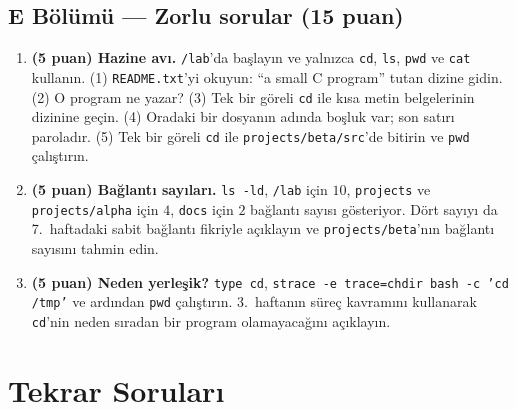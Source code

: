 \documentclass[11pt,a4paper]{article}
\newcommand{\cmd}[1]{\texttt{#1}}
\begin{document}
\subsection*{E Bölümü --- Zorlu sorular (15 puan)}
\begin{enumerate}[label=\textbf{E\arabic*}, leftmargin=2.2em, start=16]
  \item \textbf{(5 puan) Hazine avı.} \texttt{\tl/lab}'da başlayın ve yalnızca \cmd{cd}, \cmd{ls}, \cmd{pwd} ve \cmd{cat} kullanın. (1) \texttt{README.txt}'yi okuyun: ``a small C program'' tutan dizine gidin. (2) O program ne yazar? (3) Tek bir göreli \cmd{cd} ile kısa metin belgelerinin dizinine geçin. (4) Oradaki bir dosyanın adında boşluk var; son satırı paroladır. (5) Tek bir göreli \cmd{cd} ile \texttt{projects/beta/src}'de bitirin ve \cmd{pwd} çalıştırın.
  \item \textbf{(5 puan) Bağlantı sayıları.} \cmd{ls -ld}, \texttt{\tl/lab} için $10$, \texttt{projects} ve \texttt{projects/alpha} için $4$, \texttt{docs} için $2$ bağlantı sayısı gösteriyor. Dört sayıyı da 7.\ haftadaki sabit bağlantı fikriyle açıklayın ve \texttt{projects/beta}'nın bağlantı sayısını tahmin edin.
  \item \textbf{(5 puan) Neden yerleşik?} \cmd{type cd}, \cmd{strace -e trace=chdir bash -c 'cd /tmp'} ve ardından \cmd{pwd} çalıştırın. 3.\ haftanın süreç kavramını kullanarak \cmd{cd}'nin neden sıradan bir program olamayacağını açıklayın.
\end{enumerate}

\section{Tekrar Soruları}
\end{document}
